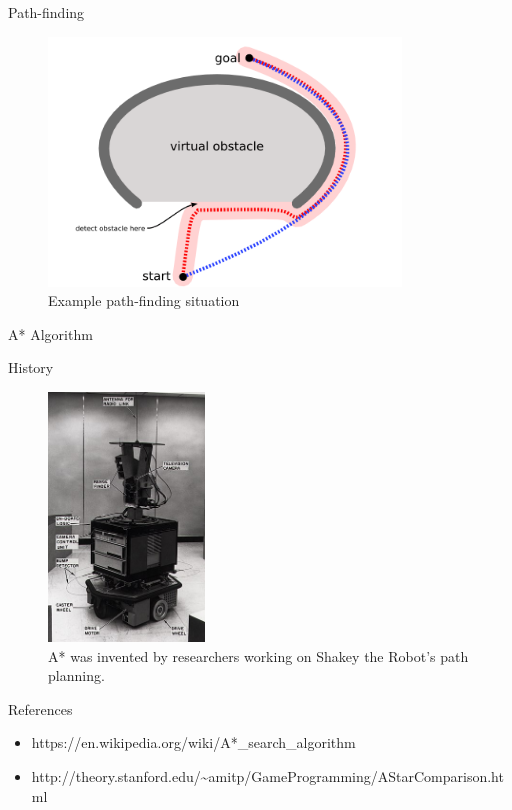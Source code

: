 \documentclass[ignorenonframetext,]{beamer}
\providecommand{\tightlist}{%
  \setlength{\itemsep}{0pt}\setlength{\parskip}{0pt}}
\begin{document}
\begin{frame}{Path-finding}
\protect\hypertarget{path-finding-1}{}

\begin{figure}
\centering
\includegraphics[width=\textwidth,height=2.60417in]{concave2.png}
\caption{Example path-finding situation}
\end{figure}

\end{frame}

\begin{frame}{A* Algorithm}
\protect\hypertarget{a-algorithm-1}{}

\begin{block}{History}

\begin{figure}
\centering
\includegraphics[width=\textwidth,height=2.60417in]{330px-SRI_Shakey_with_callouts.jpg}
\caption{A* was invented by researchers working on Shakey the Robot's
path planning.}
\end{figure}

\end{block}

\end{frame}

\begin{frame}{References}
\protect\hypertarget{references}{}

\begin{itemize}
\tightlist
\item
  https://en.wikipedia.org/wiki/A*\_search\_algorithm
\item
  http://theory.stanford.edu/\textasciitilde{}amitp/GameProgramming/AStarComparison.html
\end{itemize}

\end{frame}
\end{document}

